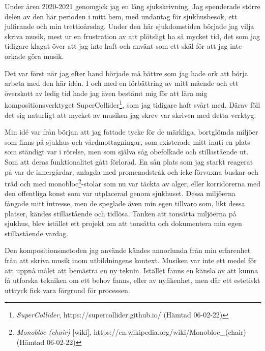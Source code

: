 \documentclass{article}
\begin{document}
Under åren 2020-2021 genomgick jag en lång sjukskrivning. Jag spenderade större delen av den här perioden i
mitt hem, med undantag för sjukhusbesök, ett julfirande och min trettioårsdag. Under den här sjukdomstiden
började jag vilja skriva musik, mest ur en frustration av att plötsligt ha så mycket tid, det som jag tidigare
klagat över att jag inte haft och använt som ett skäl för att jag inte orkade göra musik. 

Det var först när jag efter hand började må bättre som jag hade ork att börja arbeta med den här idén. I och 
med en förbättring av mitt mående och ett överskott av ledig tid hade jag även bestämt mig för att lära mig
kompositionsverktyget SuperCollider\footnote{\emph{SuperCollider}, https://supercollider.github.io/ (Hämtad
06-02-22)}, som jag tidigare haft svårt med. Därav föll det sig naturligt att mycket av musiken jag skrev var
skriven med detta verktyg. 

Min idé var från början att jag
fattade tycke för de märkliga, bortglömda miljöer som finns på sjukhus och vårdmottagningar, som existerade
mitt inuti en plats som ständigt var i rörelse, men som själva såg obefolkade och stillastående ut. Som att
deras funktionalitet gått förlorad. En sån plats som jag starkt reagerat på var de innergårdar, anlagda med
promenadstråk och icke förvuxna buskar och träd och med monobloc\footnote{\emph{Monobloc (chair)} [wiki],
https://en.wikipedia.org/wiki/Monobloc\_(chair) (Hämtad 06-02-22)}-stolar som nu var täckta av alger, eller 
korridorerna med den offentliga konst som var utplacerad genom sjukhuset. Dessa miljöerna fångade mitt
intresse, men de speglade även min egen tillvaro som, likt dessa platser, kändes stillastående och tidlösa.
Tanken att tonsätta miljöerna på sjukhus, blev istället ett projekt om att tonsätta och dokumentera min egen
stillastående vardag.

Den kompositionsmetoden jag använde kändes annorlunda från min erfarenhet från att skriva musik inom
utbildningens kontext. Musiken var inte ett medel för att uppnå målet att bemästra en ny teknin. Istället
fanns en känsla av att kunna få utforska tekniken om ett behov fanns, eller av nyfikenhet, men där ett
estetiskt uttryck fick vara förgrund för processen.

\end{document}
